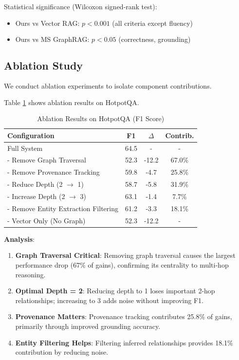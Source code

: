 \documentclass[conference]{IEEEtran}
\begin{document}
Statistical significance (Wilcoxon signed-rank test):
\begin{itemize}
    \item Ours vs Vector RAG: $p < 0.001$ (all criteria except fluency)
    \item Ours vs MS GraphRAG: $p < 0.05$ (correctness, grounding)
\end{itemize}

\subsection{Ablation Study}

We conduct ablation experiments to isolate component contributions.

Table \ref{tab:ablation} shows ablation results on HotpotQA.

\begin{table}[htbp]
\caption{Ablation Results on HotpotQA (F1 Score)}
\label{tab:ablation}
\centering
\begin{tabular}{lccc}
\toprule
\textbf{Configuration} & \textbf{F1} & \textbf{$\Delta$} & \textbf{Contrib.} \\
\midrule
Full System & 64.5 & - & - \\
\midrule
- Remove Graph Traversal & 52.3 & -12.2 & 67.0\% \\
- Remove Provenance Tracking & 59.8 & -4.7 & 25.8\% \\
- Reduce Depth (2 $\rightarrow$ 1) & 58.7 & -5.8 & 31.9\% \\
- Increase Depth (2 $\rightarrow$ 3) & 63.1 & -1.4 & 7.7\% \\
- Remove Entity Extraction Filtering & 61.2 & -3.3 & 18.1\% \\
- Vector Only (No Graph) & 52.3 & -12.2 & - \\
\bottomrule
\end{tabular}
\end{table}

\textbf{Analysis}:

\begin{enumerate}
    \item \textbf{Graph Traversal Critical}: Removing graph traversal causes the largest performance drop (67\% of gains), confirming its centrality to multi-hop reasoning.
    
    \item \textbf{Optimal Depth = 2}: Reducing depth to 1 loses important 2-hop relationships; increasing to 3 adds noise without improving F1.
    
    \item \textbf{Provenance Matters}: Provenance tracking contributes 25.8\% of gains, primarily through improved grounding accuracy.
    
    \item \textbf{Entity Filtering Helps}: Filtering inferred relationships provides 18.1\% contribution by reducing noise.
\end{enumerate}
\end{document}
